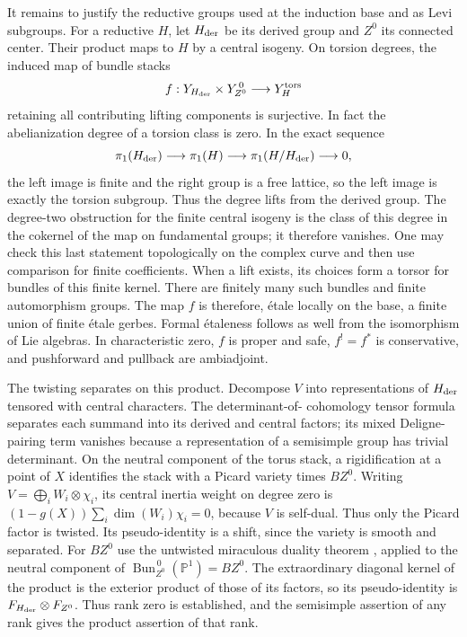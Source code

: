 It remains to justify the reductive groups used at the induction base and
as Levi subgroups.  For a reductive $H$, let $H_{\rm der}$ be its derived
group and $Z^0$ its connected center.  Their product maps to $H$ by a
central isogeny.  On torsion degrees, the induced map of bundle stacks
\[
 f:Y_{H_{\rm der}}\times Y_{Z^0}^{\,0}\longrightarrow Y_H^{\rm tors}
\]
retaining all contributing lifting components is surjective.  In fact the
abelianization degree of a torsion class is zero.  In the exact sequence
\[
 \pi_1(H_{\rm der})\longrightarrow\pi_1(H)
 \longrightarrow\pi_1(H/H_{\rm der})\longrightarrow0,
\]
the left image is finite and the right group is a free lattice, so the
left image is exactly the torsion subgroup.  Thus the degree lifts from
the derived group.  The degree-two obstruction for the finite central
isogeny is the class of this degree in the cokernel of the map on
fundamental groups; it therefore vanishes.  One may check this last statement topologically on the complex
curve and then use comparison for finite coefficients.  When a lift
exists, its choices form a torsor for bundles of this finite kernel.
There are finitely many such bundles and finite automorphism groups.
The map $f$ is therefore, \'{e}tale locally on the base, a finite union of
finite \'{e}tale gerbes.  Formal \'{e}taleness follows as well from the
isomorphism of Lie algebras.  In characteristic zero, $f$ is proper and
safe, $f^!=f^*$ is conservative, and pushforward and pullback are
ambiadjoint.

The twisting separates on this product.  Decompose $V$ into representations
of $H_{\rm der}$ tensored with central characters.  The determinant-of-
cohomology tensor formula separates each summand into its derived and
central factors; its mixed Deligne-pairing term vanishes because a
representation of a semisimple group has trivial determinant.  On the
neutral component of the torus stack, a rigidification at a point of $X$
identifies the stack with a Picard variety times $BZ^0$.  Writing $V=\bigoplus_i W_i\otimes\chi_i$, its central inertia weight
on degree zero is $(1-g(X))\sum_i\dim(W_i)\chi_i=0$, because $V$ is
self-dual.  Thus only the Picard factor is twisted.  Its
pseudo-identity is a shift, since the variety is smooth and separated.
For $BZ^0$ use the untwisted miraculous duality theorem
\cite[Theorem~0.1.6]{GaitsgoryStrange}, applied to the neutral component of
$\operatorname{Bun}_{Z^0}^{\,0}(\mathbb P^1)=BZ^0$.  The extraordinary diagonal kernel of the product is the exterior
product of those of its factors, so its pseudo-identity is
$F_{H_{\rm der}}\otimes F_{Z^0}$.  Thus rank zero is established, and
the semisimple assertion of any rank gives the product assertion of that
rank.

